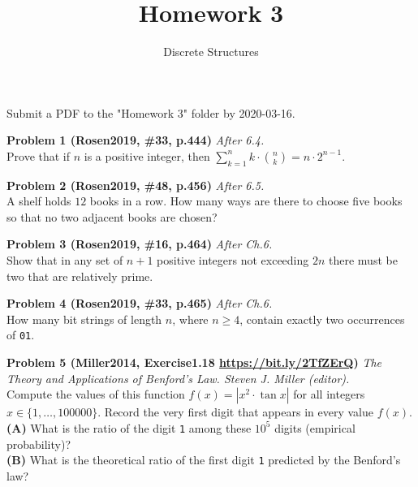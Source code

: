 \documentclass[jou]{apa6}
\title{Homework 3}
\author{Discrete Structures}
\affiliation{RBS}
\begin{document}
\maketitle
\noindent
Submit a PDF to the "Homework 3" folder by 2020-03-16.








\vspace{4pt}
{\bf Problem 1 (Rosen2019, \#33, p.444)} \textendash{} {\em After 6.4.}\\
Prove that if $n$ is a positive integer, then 
${\displaystyle \sum\limits_{k=1}^n k \cdot{} {n \choose k} = n \cdot{} 2^{n-1}}$. 

\vspace{8pt}
{\bf Problem 2 (Rosen2019, \#48, p.456)} \textendash{} {\em After 6.5.}\\
A shelf holds $12$ books in a row. How many ways are there to choose five books so that no two adjacent books 
are chosen?

\vspace{8pt}
{\bf Problem 3 (Rosen2019, \#16, p.464)} \textendash{} {\em After Ch.6.}\\
Show that in any set of $n+1$ positive integers not exceeding $2n$ there must be two 
that are relatively prime.

\vspace{8pt}
{\bf Problem 4 (Rosen2019, \#33, p.465)} \textendash{} {\em After Ch.6.}\\
How many bit strings of length $n$, where $n \geq 4$, contain exactly two 
occurrences of {\tt 01}.

\vspace{8pt}
{\bf Problem 5 (Miller2014, Exercise1.18 \url{https://bit.ly/2TfZErQ})} {\em The Theory and Applications of 
Benford's Law. Steven J. Miller (editor).}\\
Compute the values of this function $f(x) = \left| x^2 \cdot \tan x \right|$ for 
all integers $x \in \{ 1,\ldots,100000 \}$. Record the very first digit that appears in every value $f(x)$.\\
{\bf (A)} What is the ratio of the digit {\tt 1} among these $10^5$ digits (empirical probability)?\\
{\bf (B)} What is the theoretical ratio of the first digit {\tt 1} predicted by the Benford's law? 
\end{document}
